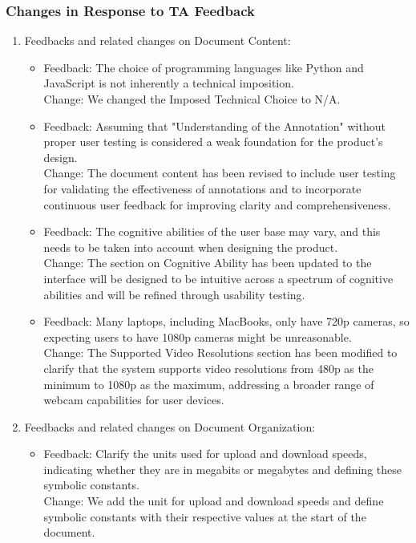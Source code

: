\documentclass{article}
\begin{document}
\subsubsection{Changes in Response to TA Feedback}
\begin{enumerate}
    \item Feedbacks and related changes on Document Content:
    \begin{itemize}
        \item Feedback: The choice of programming languages like Python and JavaScript is not inherently a technical imposition. \\
                Change: We changed the Imposed Technical Choice to N/A.
        \item Feedback: Assuming that "Understanding of the Annotation" without proper user testing is considered a weak foundation for the product's design. \\
                Change: The document content has been revised to include user testing for validating the effectiveness of annotations and to incorporate continuous user feedback for improving clarity and comprehensiveness.
        \item Feedback: The cognitive abilities of the user base may vary, and this needs to be taken into account when designing the product. \\
                Change: The section on Cognitive Ability has been updated to the interface will be designed to be intuitive across a spectrum of cognitive abilities and will be refined through usability testing.
        \item Feedback: Many laptops, including MacBooks, only have 720p cameras, so expecting users to have 1080p cameras might be unreasonable. \\
                Change: The Supported Video Resolutions section has been modified to clarify that the system supports video resolutions from 480p as the minimum to 1080p as the maximum, 
                addressing a broader range of webcam capabilities for user devices.
        \end{itemize}
    \item Feedbacks and related changes on Document Organization:
    \begin{itemize}
        \item Feedback: Clarify the units used for upload and download speeds, indicating whether they are in megabits or megabytes and defining these symbolic constants.\\
                Change: We add the unit for upload and download speeds and define symbolic constants with their respective values at the start of the document.

\end{itemize}
\end{enumerate}
\end{document}
